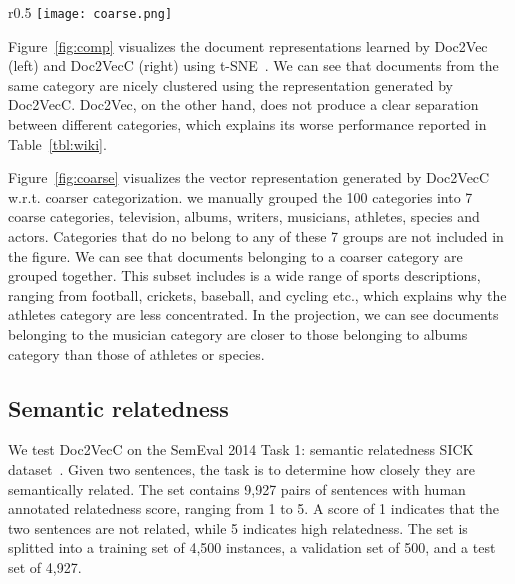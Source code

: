 \documentclass{article} \usepackage{iclr2017_conference,times}
\newcommand{\name}{Doc2VecC}
\begin{document}
\begin{wrapfigure}{r}{0.5\textwidth}
\vspace{-0.3in}
\centering
  \texttt{[image: coarse.png]}
\caption{Visualization of Wikipedia \name{} vectors using t-SNE.}\label{fig:coarse}
  \vspace{-0.2in}
\end{wrapfigure} 
Figure~\ref{fig:comp} visualizes the document representations learned by Doc2Vec (left) and \name{} (right) using t-SNE~\citep{maaten2008visualizing}.  We can see that documents from the same category are nicely clustered using the representation generated by \name{}.  Doc2Vec, on the other hand, does not produce a clear separation between different categories, which explains its worse performance reported in Table~\ref{tbl:wiki}. 



Figure~\ref{fig:coarse} visualizes the vector representation generated by \name{} w.r.t. coarser categorization. we manually grouped the 100 categories into 7 coarse categories,  television, albums, writers, musicians, athletes, species and actors. Categories that do no belong to any of these 7 groups are not included in the figure. We can see that documents belonging to a coarser category are grouped together. This subset includes  is a wide range of sports descriptions, ranging from football, crickets, baseball, and cycling etc., which explains why the athletes category are less concentrated. In the projection, we can see documents belonging to the musician category are closer to those belonging to albums category than those of athletes or species. 


\subsection{Semantic relatedness}

We test \name{} on the SemEval 2014 Task 1: semantic relatedness SICK dataset~\citep{marelli2014semeval}. Given two sentences, the task is to determine how closely they are semantically related.  The set contains 9,927 pairs of sentences with human annotated relatedness score, ranging from 1 to 5. A score of 1 indicates that the two sentences are not related, while 5 indicates high relatedness. The set is splitted into a training set of 4,500 instances, a validation set of 500, and a test set of 4,927. 
\end{document}
